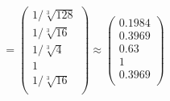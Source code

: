 \documentclass[10pt,a4paper]{article}
\begin{document}
	\[
		 = 
		\begin{pmatrix}
			{1} / {\sqrt[3]{128}} \\
			{1} / {\sqrt[3]{16}} \\
			{1} / {\sqrt[3]{4}} \\
			{1}{} \\
			{1} / {\sqrt[3]{16}} \\
		\end{pmatrix}
		\approx
		\begin{pmatrix}
			0.1984   \\
			0.3969   \\
			0.63     \\
			1        \\
			0.3969   \\
		\end{pmatrix}
	\]
\end{document}
